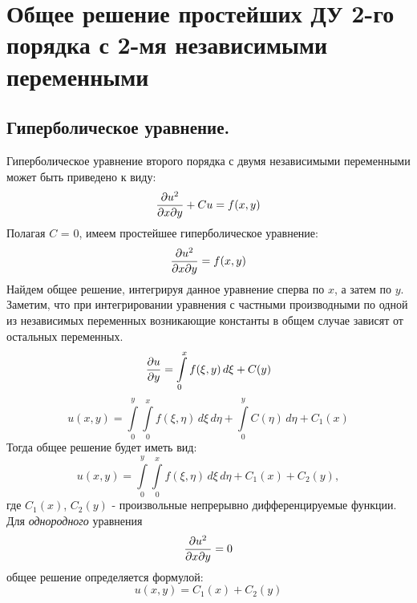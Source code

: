 \documentclass[../main.tex]{subfiles}
\begin{document}
\section{Общее решение простейших ДУ 2-го порядка с 2-мя независимыми переменными}
\subsection{Гиперболическое уравнение.}
Гиперболическое уравнение второго порядка с двумя независимыми переменными может быть приведено к виду:
\[
    \pderivTwo{u}{x}{y} + Cu = f(x, y)
\]
Полагая $C$ = 0, имеем простейшее гиперболическое уравнение:
\[
    \pderivTwo{u}{x}{y} = f(x, y)
\]
Найдем общее решение, интегрируя данное уравнение сперва по $x$, а затем по $y$. \\Заметим, что при интегрировании уравнения с частными производными по одной из независимых переменных возникающие константы в общем случае зависят от остальных переменных.
\[
    \frac{\partial u}{\partial y} = \int\limits_{0}^{x}f(\xi, y)\,d\xi + C(y)
\]
\[
    u(x,y) = \int\limits_{0}^{y}\int\limits_{0}^{x}f(\xi, \eta)\,d\xi\,d\eta + \int\limits_{0}^{y}C(\eta)\,d\eta + C_1(x)
\]
Тогда общее решение будет иметь вид:
\[
    u(x,y) = \int\limits_{0}^{y}\int\limits_{0}^{x}f(\xi, \eta)\,d\xi\,d\eta + C_1(x) + C_2(y),
\]
где $C_1(x)$, $C_2(y)$ - произвольные непрерывно дифференцируемые функции.\\
Для \textit{однородного} уравнения
\[
    \pderivTwo{u}{x}{y} = 0
\]
общее решение определяется формулой:
\[
        u(x,y) = C_1(x) + C_2(y)
\]
\end{document}
